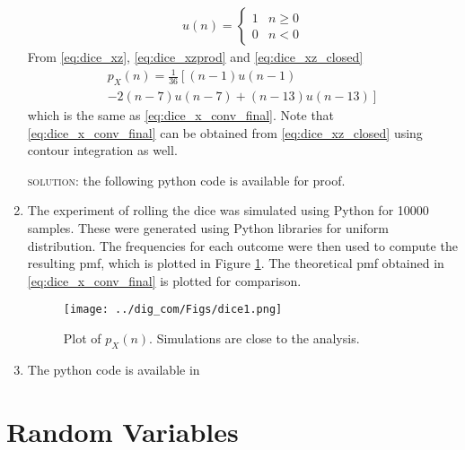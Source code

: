 \documentclass{article}
\numberwithin{equation}{subsection}
\numberwithin{figure}{subsection}
\providecommand{\brak}[1]{\ensuremath{\left(#1\right)}}
\providecommand{\lsbrak}[1]{\ensuremath{{}\left[#1\right.}}
\providecommand{\rsbrak}[1]{\ensuremath{{}\left.#1\right]}}
\renewcommand\thesection{\arabic{section}}
\renewcommand\thesubsection{\thesection.\arabic{subsection}}
\begin{document}
\begin{enumerate}[label=\thesubsection.\arabic*.,ref=\thesubsection.\arabic{figure}]
\begin{align}
u(n) =
\begin{cases}
1 & n \ge 0
\\
0 & n < 0
\end{cases}
\end{align}
From \eqref{eq:dice_xz}, \eqref{eq:dice_xzprod} and \eqref{eq:dice_xz_closed}
\begin{multline}
p_{X}(n) = \frac{1}{36}\lsbrak{\brak{n-1}u(n-1) 
}
\\
\rsbrak{- 2 \brak{n-7}u(n-7)+\brak{n-13}u(n-13)}
\end{multline}
which is the same as \eqref{eq:dice_x_conv_final}.  Note that  \eqref{eq:dice_x_conv_final} can be obtained from \eqref{eq:dice_xz_closed} using contour integration as well.
\begin{flushleft}
 \textsc{solution:} the following python code is available for proof.
 \end{flushleft}
  \begin{center}
\end{center}
\item 
The experiment of rolling the dice was simulated using Python for 10000 samples.  These were generated using Python libraries for uniform distribution. The frequencies for each outcome were then used to compute the resulting pmf, which  is plotted in Figure \ref{fig:dice}.  The theoretical pmf obtained in \eqref{eq:dice_x_conv_final} is plotted for comparison.
\begin{figure}[!ht]
\centering
\texttt{[image: ../dig\_com/Figs/dice1.png]} 
\caption{Plot of $p_X(n)$.  Simulations are close to the analysis. }
\label{fig:dice}
\end{figure}
\item The python code is available in 
\begin{center}
\end{center}
\end{enumerate}
\section{Random Variables}
\end{document}
